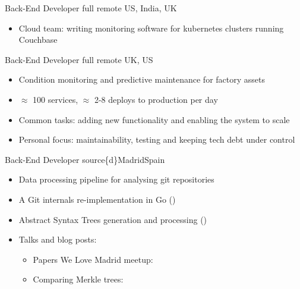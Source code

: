 \documentclass[11pt,a4paper]{moderncv}
\begin{document}
  {Back-End Developer}
  {\href{https://www.couchbase.com/}{\color{link}{Couchbase}}}
  {full remote}
  {US, India, UK}
  {
  \begin{itemize}
    \item Cloud team: writing monitoring software for kubernetes clusters running Couchbase
  \end{itemize}
}

  {Back-End Developer}
  {\href{https://www.senseye.io}{\color{link}{Senseye}}}
  {full remote}
  {UK, US}
  {
  \begin{itemize}
    \item Condition monitoring and predictive maintenance for factory assets
    \item $\approx$ 100 services, $\approx$ 2-8 deploys to production per day
    \item Common tasks:
      adding new functionality
      and enabling the system to scale
    \item Personal focus: maintainability, testing and keeping tech debt under control
  \end{itemize}
}

  {Back-End Developer}
  {source\{d\}}{Madrid}{Spain}{
  \begin{itemize}
    \item Data processing pipeline for analysing git repositories
    \item A Git internals re-implementation in Go (\href{https://github.com/src-d/go-git}{\color{link}{go-git}})
    \item Abstract Syntax Trees generation and processing (\href{https://github.com/bblfsh}{\color{link}{bblfsh}})
    \item Talks and blog posts:
      \begin{itemize}
        \item Papers We Love Madrid meetup: \href{https://www.youtube.com/watch?v=P18BYZvnSx8}{\color{link}{Diff and Blame: an intuitive overview}}
        \item Comparing Merkle trees: \href{https://github.com/alcortesm/blog-post-difftree/blob/master/README.md}{\color{link}{Comparing Git trees in Go}}
      \end{itemize}
  \end{itemize}
}

\end{document}
